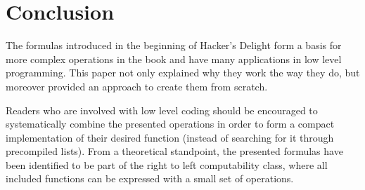 \section{Conclusion}\label{sec:conclusion}
The formulas introduced in the beginning of Hacker's Delight
\cite{Warren:2012:HD:2462741}
form a basis for more complex operations in the book
and have many applications in low level programming.
This paper not only explained why they work the way they do,
but moreover provided an approach to create them from scratch.

Readers who are involved with low level coding
should be encouraged to systematically combine the presented operations
in order to form a compact implementation of their desired function
(instead of searching for it through precompiled lists).
From a theoretical standpoint,
the presented formulas have been identified to be part of
the right to left computability class,
where all included functions can be expressed
with a small set of operations.
